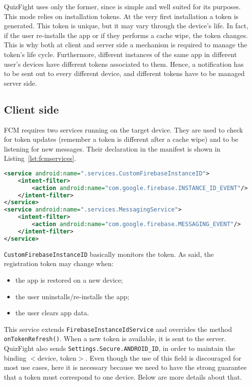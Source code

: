 QuizFight uses only the former, since is simple and well suited for its
purposes. This mode relies on installation tokens. At the very first
installation a token is generated.
This token is unique, but it may vary through the device's life.
In fact, if the user re-installs the app or if they performs a cache wipe,
the token changes.
This is why both at client and server side a mechanism is required to
manage the token's life cycle.
Furthermore, different instances of the same app in different user's devices
have different tokens associated to them.
Hence, a notification has to be sent out to every different device, and
different tokens have to be managed server side.

\subsection{Client side}
FCM requires two services running on the target device.
They are used to check for token updates (remember a token is different after
a cache wipe) and to be listening for new messages.
Their declaration in the manifest is shown in Listing~\ref{lst:fcmservices}.

\begin{lstlisting}[language=xml, caption={FCM Services}, label={lst:fcmservices}]
<service android:name=".services.CustomFirebaseInstanceID">
	<intent-filter>
		<action android:name="com.google.firebase.INSTANCE_ID_EVENT"/>
	</intent-filter>
</service>
<service android:name=".services.MessagingService">
	<intent-filter>
		<action android:name="com.google.firebase.MESSAGING_EVENT"/>
	</intent-filter>
</service>
\end{lstlisting}

\texttt{CustomFirebaseInstanceID} basically monitors the token.
As said, the registration token may change when:

\begin{itemize}
	\item the app is restored on a new device;
	\item the user uninstalls/re-installs the app;
	\item the user clears app data.
\end{itemize}

This service extends \texttt{FirebaseInstanceIdService} and overrides the
method \texttt{onTokenRefresh()}.
When a new token is available, it is sent to the server.
QuizFight also sends \texttt{Settings.Secure.ANDROID\_ID}, in order to
maintain the binding $<$device, token$>$. Even though the use of this field is
discouraged for most use cases, here it is necessary because we need to have
the strong guarantee that a token must correspond to one device.
Below are more details about that. \\

